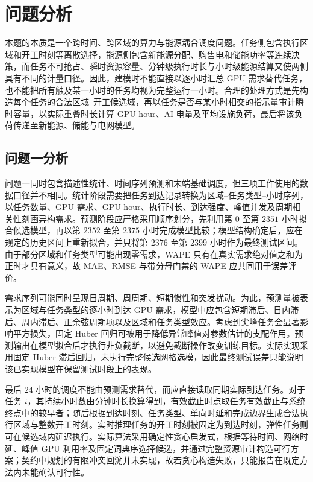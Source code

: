 \section{问题分析}

本题的本质是一个跨时间、跨区域的算力与能源耦合调度问题。任务侧包含执行区域和开工时刻等离散选择，能源侧包含新能源分配、购售电和储能功率等连续决策，而任务不可抢占、瞬时资源容量、分钟级执行时长与小时级能源结算又使两侧具有不同的计量口径。因此，建模时不能直接以逐小时汇总 GPU 需求替代任务，也不能把所有触及某一小时的任务均视为完整运行一小时。合理的处理方式是先构造每个任务的合法区域--开工候选域，再以任务是否与某小时相交的指示量审计瞬时容量，以实际重叠时长计算 GPU-hour、AI 电量及平均设施负荷，最后将该负荷传递至新能源、储能与电网模型。

\subsection{问题一分析}

问题一同时包含描述性统计、时间序列预测和末端基础调度，但三项工作使用的数据口径并不相同。统计阶段需要把任务到达记录转换为区域--任务类型--小时序列，以任务数量、GPU 需求、GPU-hour、执行时长、到达强度、峰值并发及周期相关性刻画异构需求。预测阶段应严格采用顺序划分，先利用第 $0$ 至第 $2351$ 小时拟合候选模型，再以第 $2352$ 至第 $2375$ 小时完成模型比较；模型结构确定后，应在规定的历史区间上重新拟合，并只将第 $2376$ 至第 $2399$ 小时作为最终测试区间。由于部分区域和任务类型可能出现零需求，WAPE 只有在真实需求绝对值之和为正时才具有意义，故 MAE、RMSE 与带分母门禁的 WAPE 应共同用于误差评价。

需求序列可能同时呈现日周期、周周期、短期惯性和突发扰动。为此，预测量被表示为区域与任务类型的逐小时到达 GPU 需求，模型中应包含短期滞后、日内滞后、周内滞后、正余弦周期项以及区域和任务类型效应。考虑到尖峰任务会显著影响平方损失，固定 Huber 回归可被用于降低异常峰值对参数估计的支配作用。预测输出在模型拟合后才执行非负截断，以避免截断操作改变训练目标。实际实现采用固定 Huber 滞后回归，未执行完整候选网格选模，因此最终测试误差只能说明该已实现模型在保留测试时段上的表现。

最后 $24$ 小时的调度不能由预测需求替代，而应直接读取同期实际到达任务。对于任务 $i$，其持续小时数由分钟时长换算得到，有效截止时点取任务有效截止与系统终点中的较早者；随后根据到达时刻、任务类型、单向时延和完成边界生成合法执行区域与整数开工时刻。实时推理任务的开工时刻被固定为到达时刻，弹性任务则可在候选域内延迟执行。实际算法采用确定性贪心启发式，根据等待时间、网络时延、峰值 GPU 利用率及固定词典序选择候选，并通过完整资源审计构造可行方案；契约中规划的有限冲突回溯并未实现，故若贪心构造失败，只能报告在既定方法内未能确认可行性。

